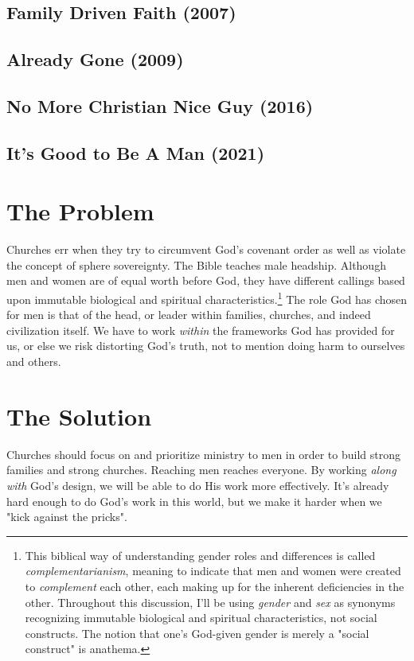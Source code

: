 \documentclass[justified, nobib]{tufte-handout}
\begin{document}
\ifdefined\embedversion\enlargethispage{5\baselineskip}\fi
\subsection{Family Driven Faith (2007)}

\subsection{Already Gone (2009)}

\subsection{No More Christian Nice Guy (2016)}

\subsection{It's Good to Be A Man (2021)}

\ifdefined\embedversion\newpage\fi
\section{The Problem}
Churches err when they try to circumvent God's covenant order as well as violate the concept of sphere sovereignty.  The Bible teaches male headship. Although men and women are of equal worth before God, they have different callings based upon immutable biological and spiritual characteristics.\footnote{This biblical way of understanding gender roles and differences is called \textit{complementarianism}, meaning to indicate that men and women were created to \textit{complement} each other, each making up for the inherent deficiencies in the other.  Throughout this discussion, I'll be using \textit{gender} and \textit{sex} as synonyms recognizing immutable biological and spiritual characteristics, not social constructs.  The notion that one's God-given gender is merely a "social construct" is anathema.}  The role God has chosen for men is that of the head, or leader within families, churches, and indeed civilization itself.  We have to work \textit{within} the frameworks God has provided for us, or else we risk distorting God's truth, not to mention doing harm to ourselves and others.

\ifdefined\embedversion\newpage\fi
\section{The Solution}
Churches should focus on and prioritize ministry to men in order to build strong families and strong churches.  Reaching men reaches everyone.  By working \textit{along with} God's design, we will be able to do His work more effectively.  It's already hard enough to do God's work in this world, but we make it harder when we "kick against the pricks".  
\end{document}

